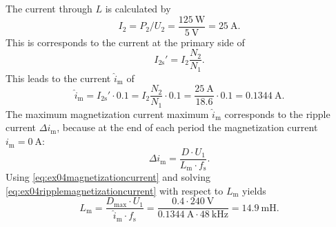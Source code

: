 \begin{solutionblock}
    The current through $L$ is calculated by
    \begin{equation}
        I_\mathrm{2}=P_\mathrm{2}/U_\mathrm{2}=\frac{\SI{125}{\watt}}{\SI{5}{\volt}}=\SI{25}{\ampere}
        \label{eq:ex04ouputcurrent}.
    \end{equation}
    This is corresponds to the current at the primary side of
    \begin{equation}
        I_\mathrm{2s}'=I_\mathrm{2}\frac{N_\mathrm{2}}{N_\mathrm{1}}.
    \end{equation}
    This leads to the current $\hat{i}_\mathrm{m}$ of
    \begin{equation}
        \hat{i}_\mathrm{m}=I_\mathrm{2s}'\cdot 0.1=I_\mathrm{2}\frac{N_\mathrm{2}}{N_\mathrm{1}}\cdot 0.1
        =\frac{\SI{25}{\ampere}}{18.6} \cdot 0.1 =\SI{0.1344}{\ampere}.
        \label{eq:ex04magnetizationcurrent}  
    \end{equation}
    The maximum magnetization current maximum $\hat{i}_\mathrm{m}$ corresponds to the ripple current $\Delta{i}_\mathrm{m}$,
    because at the end of each period the magnetization current $i_\mathrm{m}=\SI{0}{\ampere}$:
    \begin{equation}
        \Delta i_\mathrm{m}= \frac{D \cdot U_\mathrm{1}}{L_\mathrm{m} \cdot f_\mathrm{s}}.
        \label{eq:ex04ripplemagnetizationcurrent}
    \end{equation}
    Using \eqref{eq:ex04magnetizationcurrent} and solving \eqref{eq:ex04ripplemagnetizationcurrent} 
    with respect to $L_\mathrm{m}$ yields
    \begin{equation}
        L_\mathrm{m}= \frac{D_\mathrm{max} \cdot U_\mathrm{1}}{\hat{i}_\mathrm{m} \cdot f_\mathrm{s}}
                    = \frac{0.4 \cdot \SI{240}{\volt}}{\SI{0.1344}{\ampere} \cdot \SI{48}{\kilo\hertz}}=\SI{14.9}{\milli\henry}.
    \end{equation}
\end{solutionblock}

